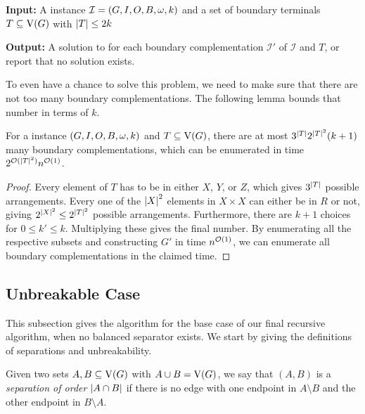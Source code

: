 \begin{theorem}
\begin{tcolorbox}[enhanced,title={\color{black} {\scsborder{}}}, colback=white, boxrule=0.4pt,
	attach boxed title to top left={xshift=.3cm, yshift*=-2.5mm},
	boxed title style={size=small,frame hidden,colback=white}]
	\textbf{Input:}  
A \scsrec{} instance $\mathcal{I} = (G,I,O,B,\operatorname{\omega},k)$ and a set of boundary terminals $T \subseteq \operatorname{V}({G})$ with $\abs{T} \le 2k$

	\textbf{Output:}
A solution to \scsrec{} for each boundary complementation $\mathcal{I}'$ of $\mathcal{I}$ and $T$, or report that no solution exists.
\end{tcolorbox}

To even have a chance to solve this problem, we need to make sure that there are not too many boundary complementations. The following lemma bounds that number in terms of $k$. %

\iflong
\begin{lemma}
\else
\begin{lemma}[$\star$]
\fi
\label{lem:number_border_complementations}
  For a \scsrec{} instance $(G,I,O,B,\operatorname{\omega},k)$ and $T \subseteq \operatorname{V}({G})$, there are at most $3^{\abs{T}}2^{\abs{T}^2}(k+1)$ many boundary complementations, which can be enumerated in time $2^{\bigO{\abs{T}^2}}n^{\bigO{1}}$.
\end{lemma}
\iflong
\begin{proof}
  Every element of $T$ has to be in either $X$, $Y$, or $Z$, which gives $3^{\abs{T}}$ possible arrangements. Every one of the $\abs{X}^2$ elements in $X\times X$ can either be in $R$ or not, giving $2^{\abs{X}^2} \le 2^{\abs{T}^2}$ possible arrangements. Furthermore, there are $k+1$ choices for $0 \le k' \le k$. Multiplying these gives the final number. By enumerating all the respective subsets and constructing $G'$ in time $n^{\mathcal{O}(1)}$, we can enumerate all boundary complementations in the claimed time.
\end{proof}
\fi

\subsection{Unbreakable Case}\label{sec:unbreak}

This subsection gives the algorithm for the base case of our final recursive algorithm, when no balanced separator exists. We start by giving the definitions of separations and unbreakability.

\begin{definition}[Separation]
  Given two sets $A, B \subseteq \operatorname{V}({G})$ with $A \cup B = \operatorname{V}({G})$, we say that $(A, B)$ is a \emph{separation of order $\abs{A \cap B}$} if there is no edge with one endpoint in $A \setminus B$ and the other endpoint in $B \setminus A$.
\end{definition}


\end{lemma}
\end{theorem}
